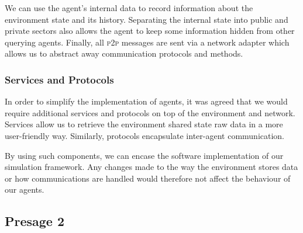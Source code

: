 We can use the agent's internal data to record information about the environment state and its history. Separating the internal state into public and private sectors also allows the agent to keep some information hidden from other querying agents. Finally, all \textsc{p2p} messages are sent via a network adapter which allows us to abstract away communication protocols and methods.

\subsubsection{Services and Protocols}

In order to simplify the implementation of agents, it was agreed that we would require additional services and protocols on top of the environment and network. Services allow us to retrieve the environment shared state raw data in a more user-friendly way. Similarly, protocols encapsulate inter-agent communication.

By using such components, we can encase the software implementation of our simulation framework. Any changes made to the way the environment stores data or how communications are handled would therefore not affect the behaviour of our agents.

\subsection{Presage 2}

